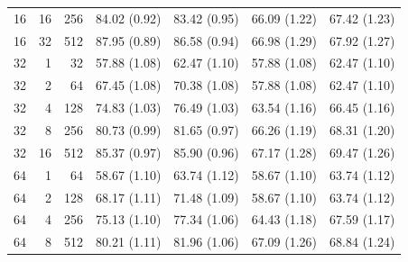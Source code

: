 \documentclass{article}
\begin{document}
\begin{table}[!htbp]
\begin{tabular}{@{}rrr rrrr@{}}
16 & 16 & 256 & 84.02 {\scriptsize (0.92)} & 83.42 {\scriptsize (0.95)} & 66.09 {\scriptsize (1.22)} & 67.42 {\scriptsize (1.23)} \\
16 & 32 & 512 & 87.95 {\scriptsize (0.89)} & 86.58 {\scriptsize (0.94)} & 66.98 {\scriptsize (1.29)} & 67.92 {\scriptsize (1.27)} \\
\midrule
32 & 1 & 32 & 57.88 {\scriptsize (1.08)} & 62.47 {\scriptsize (1.10)} & 57.88 {\scriptsize (1.08)} & 62.47 {\scriptsize (1.10)} \\
32 & 2 & 64 & 67.45 {\scriptsize (1.08)} & 70.38 {\scriptsize (1.08)} & 57.88 {\scriptsize (1.08)} & 62.47 {\scriptsize (1.10)} \\
32 & 4 & 128 & 74.83 {\scriptsize (1.03)} & 76.49 {\scriptsize (1.03)} & 63.54 {\scriptsize (1.16)} & 66.45 {\scriptsize (1.16)} \\
32 & 8 & 256 & 80.73 {\scriptsize (0.99)} & 81.65 {\scriptsize (0.97)} & 66.26 {\scriptsize (1.19)} & 68.31 {\scriptsize (1.20)} \\
32 & 16 & 512 & 85.37 {\scriptsize (0.97)} & 85.90 {\scriptsize (0.96)} & 67.17 {\scriptsize (1.28)} & 69.47 {\scriptsize (1.26)} \\
\midrule
64 & 1 & 64 & 58.67 {\scriptsize (1.10)} & 63.74 {\scriptsize (1.12)} & 58.67 {\scriptsize (1.10)} & 63.74 {\scriptsize (1.12)} \\
64 & 2 & 128 & 68.17 {\scriptsize (1.11)} & 71.48 {\scriptsize (1.09)} & 58.67 {\scriptsize (1.10)} & 63.74 {\scriptsize (1.12)} \\
64 & 4 & 256 & 75.13 {\scriptsize (1.10)} & 77.34 {\scriptsize (1.06)} & 64.43 {\scriptsize (1.18)} & 67.59 {\scriptsize (1.17)} \\
64 & 8 & 512 & 80.21 {\scriptsize (1.11)} & 81.96 {\scriptsize (1.06)} & 67.09 {\scriptsize (1.26)} & 68.84 {\scriptsize (1.24)} \\
\bottomrule
\end{tabular}
\end{table}
\end{document}
